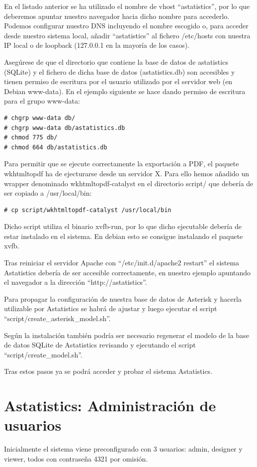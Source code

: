 \documentclass[spanish,12pt]{book}
\begin{document}
En el listado anterior se ha utilizado el nombre de vhost ``astatistics'', por lo que deberemos apuntar nuestro navegador hacia dicho nombre para accederlo. Podemos configurar nuestro DNS incluyendo el nombre escogido o, para acceder desde nuestro sistema local, añadir ``astatistics'' al fichero /etc/hosts con nuestra IP local o de loopback (127.0.0.1 en la mayoría de los casos).

Asegúrese de que el directorio que contiene la base de datos de astatistics (SQLite) y el fichero de dicha base de datos (astatistics.db) son accesibles y tienen permiso de escritura por el usuario utilizado por el servidor web (en Debian www-data). En el ejemplo siguiente se hace dando permiso de escritura para el grupo www-data:

\begin{lstlisting}
# chgrp www-data db/
# chgrp www-data db/astatistics.db
# chmod 775 db/
# chmod 664 db/astatistics.db
\end{lstlisting}

Para permitir que se ejecute correctamente la exportación a PDF, el paquete wkhtmltopdf ha de ejecturarse desde un servidor X. Para ello hemos añadido un wrapper denominado wkhtmltopdf-catalyst en el directorio script/ que debería de ser copiado a /usr/local/bin:

\begin{lstlisting}
# cp script/wkhtmltopdf-catalyst /usr/local/bin
\end{lstlisting}

Dicho script utiliza el binario xvfb-run, por lo que dicho ejecutable debería de estar instalado en el sistema. En debian esto se consigue instalando el paquete xvfb.

Tras reiniciar el servidor Apache con ``/etc/init.d/apache2 restart'' el sistema Astatistics debería de ser accesible correctamente, en nuestro ejemplo apuntando el navegador a la dirección ``http://astatistics''.

Para propagar la configuración de nuestra base de datos de Asterisk y hacerla utilizable por Astatistics se habrá de ajustar y luego ejecutar el script ``script/create\_asterisk\_model.sh''.

Según la instalación también podría ser necesario regenerar el modelo de la base de datos SQLite de Astatistics revisando y ejecutando el script ``script/create\_model.sh''.

Tras estos pasos ya se podrá acceder y probar el sistema Astatistics.

\chapter{Astatistics: Administración de usuarios}
Inicialmente el sistema viene preconfigurado con 3 usuarios: admin, designer y viewer, todos con contraseña 4321 por omisión.
\end{document}
